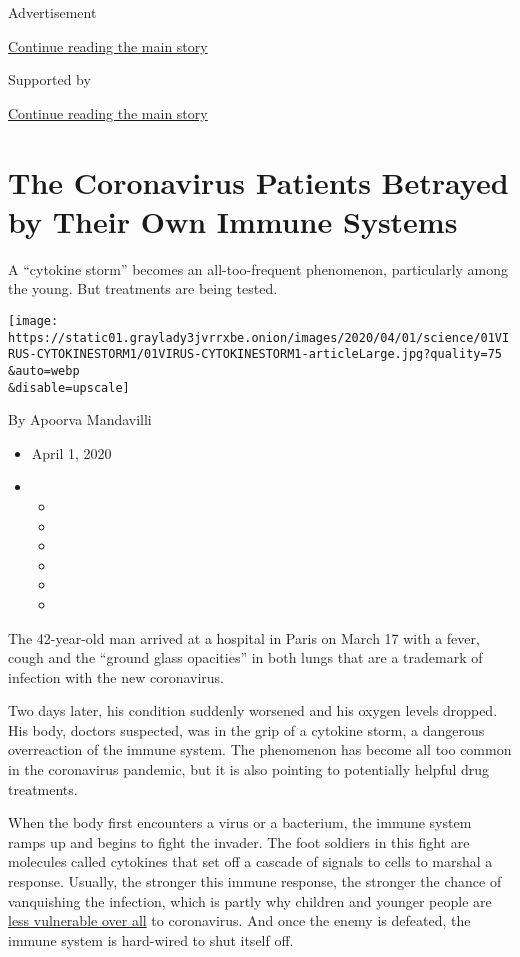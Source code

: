 Advertisement

\protect\hyperlink{after-top}{Continue reading the main story}

Supported by

\protect\hyperlink{after-sponsor}{Continue reading the main story}

\hypertarget{the-coronavirus-patients-betrayed-by-their-own-immune-systems}{%
\section{The Coronavirus Patients Betrayed by Their Own Immune
Systems}\label{the-coronavirus-patients-betrayed-by-their-own-immune-systems}}

A ``cytokine storm'' becomes an all-too-frequent phenomenon,
particularly among the young. But treatments are being tested.

\texttt{[image: https://static01.graylady3jvrrxbe.onion/images/2020/04/01/science/01VIRUS-CYTOKINESTORM1/01VIRUS-CYTOKINESTORM1-articleLarge.jpg?quality=75\\\&auto=webp\\\&disable=upscale]}

By Apoorva Mandavilli

\begin{itemize}
\item
  April 1, 2020
\item
  \begin{itemize}
  \item
  \item
  \item
  \item
  \item
  \item
  \end{itemize}
\end{itemize}

The 42-year-old man arrived at a hospital in Paris on March 17 with a
fever, cough and the ``ground glass opacities'' in both lungs that are a
trademark of infection with the new coronavirus.

Two days later, his condition suddenly worsened and his oxygen levels
dropped. His body, doctors suspected, was in the grip of a cytokine
storm, a dangerous overreaction of the immune system. The phenomenon has
become all too common in the coronavirus pandemic, but it is also
pointing to potentially helpful drug treatments.

When the body first encounters a virus or a bacterium, the immune system
ramps up and begins to fight the invader. The foot soldiers in this
fight are molecules called cytokines that set off a cascade of signals
to cells to marshal a response. Usually, the stronger this immune
response, the stronger the chance of vanquishing the infection, which is
partly why children and younger people are
\href{https://www.nytimes3xbfgragh.onion/2020/02/05/health/coronavirus-children.html}{less
vulnerable over all} to coronavirus. And once the enemy is defeated, the
immune system is hard-wired to shut itself off.

